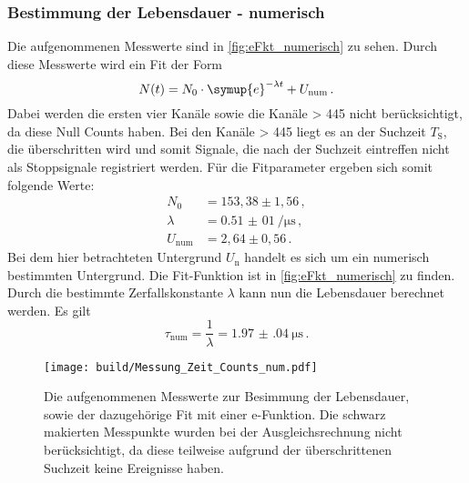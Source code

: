   \subsubsection{Bestimmung der Lebensdauer - numerisch}
    Die aufgenommenen Messwerte sind in \autoref{fig:eFkt_numerisch} zu sehen.
    Durch diese Messwerte wird ein Fit der Form
    \begin{equation*}
      N(t) = N_0 \cdot \symup{e}^{-\lambda t} +U_\text{num} \, .
    \end{equation*}
    Dabei werden die ersten vier Kanäle sowie die Kanäle > 445 nicht berücksichtigt, da diese Null Counts haben.
    Bei den Kanäle > 445 liegt es an der Suchzeit $T_\text{S}$, die überschritten wird und somit Signale, die nach der Suchzeit eintreffen nicht als Stoppsignale registriert werden.
    Für die Fitparameter ergeben sich somit folgende Werte:
    \begin{align*}
      N_0 &= 153,38 \pm 1,56 \, ,\\
      \lambda &= \SI{0,51(01)}{\per\micro\second} \, ,\\
      U_\text{num} &= 2,64 \pm 0,56 \, .
    \end{align*}
    Bei dem hier betrachteten Untergrund $U_\text{n}$ handelt es sich um ein numerisch bestimmten Untergrund.
    Die Fit-Funktion ist in \autoref{fig:eFkt_numerisch} zu finden.
    Durch die bestimmte Zerfallskonstante $\lambda$ kann nun die Lebensdauer berechnet werden.
    Es gilt
    \begin{equation*}
      \tau_\text{num} = \frac{1}{\lambda} = \SI{1.97(04)}{\micro\second} \, .
    \end{equation*}
    \begin{figure}
      \centering
      \texttt{[image: build/Messung\_Zeit\_Counts\_num.pdf]}
      \caption{Die aufgenommenen Messwerte zur Besimmung der Lebensdauer, sowie der dazugehörige Fit mit einer e-Funktion.
                Die schwarz makierten Messpunkte wurden bei der Ausgleichsrechnung nicht berücksichtigt, da diese teilweise aufgrund der überschrittenen Suchzeit keine Ereignisse haben.}
      \label{fig:eFkt_numerisch}
    \end{figure}


